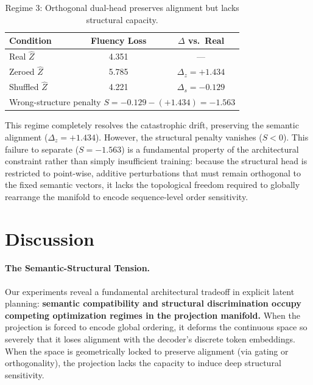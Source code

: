 \documentclass[11pt]{article}
\begin{document}
\begin{table}[h]
\centering
\caption{Regime 3: Orthogonal dual-head preserves alignment but lacks structural capacity.}
\label{tab:exp5_dual}
\begin{tabular}{lcc}
\toprule
\textbf{Condition} & \textbf{Fluency Loss} & \textbf{$\Delta$ vs.\ Real} \\
\midrule
Real $\hat{Z}$ & 4.351 & — \\
Zeroed $\hat{Z}$ & 5.785 & $\Delta_z = \mathbf{+1.434}$ \\
Shuffled $\hat{Z}$ & 4.221 & $\Delta_s = -0.129$ \\
\midrule
\multicolumn{3}{l}{Wrong-structure penalty $S = -0.129 - (+1.434) = -1.563$} \\
\bottomrule
\end{tabular}
\end{table}

This regime completely resolves the catastrophic drift, preserving the semantic alignment ($\Delta_z = +1.434$). However, the structural penalty vanishes ($S < 0$). This failure to separate ($S = -1.563$) is a fundamental property of the architectural constraint rather than simply insufficient training: because the structural head is restricted to point-wise, additive perturbations that must remain orthogonal to the fixed semantic vectors, it lacks the topological freedom required to globally rearrange the manifold to encode sequence-level order sensitivity.

\section{Discussion}
\label{sec:discussion}

\paragraph{The Semantic-Structural Tension.}
Our experiments reveal a fundamental architectural tradeoff in explicit latent planning: \textbf{semantic compatibility and structural discrimination occupy competing optimization regimes in the projection manifold.} 
When the projection is forced to encode global ordering, it deforms the continuous space so severely that it loses alignment with the decoder's discrete token embeddings. When the space is geometrically locked to preserve alignment (via gating or orthogonality), the projection lacks the capacity to induce deep structural sensitivity. 
\end{document}
